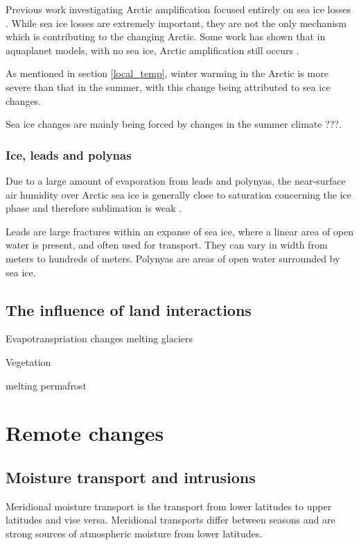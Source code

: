 \documentclass[11pt, oneside]{article}
\begin{document}
Previous work investigating Arctic amplification focused entirely on sea ice losses \cite{serreze2009emergence}. While sea ice losses are extremely important, they are not the only mechanism which is contributing to the changing Arctic.  Some work has shown that in aquaplanet models, with no sea ice, Arctic amplification still occurs \cite{russotto2020polar}.

As mentioned in section \ref{local_temp}, winter warming in the Arctic is more severe than that in the summer, with this change being attributed to sea ice changes.

Sea ice changes are mainly being forced by changes in the summer climate ???.

\subsubsection{Ice, leads and polynas}
 Due to a large amount of evaporation from leads and polynyas, the near-surface air humidity over Arctic sea ice is generally close to saturation concerning the ice phase and therefore sublimation is weak \cite{andreas2002near}. 
 
 Leads are large fractures within an expanse of sea ice, where a linear area of open water is present, and often used for transport. They can vary in width from meters to hundreds of meters. Polynyas are areas of open water surrounded by sea ice.



\subsection{The influence of land interactions}
Evapotranspriation changes 
melting glaciers 

Vegetation

melting permafrost 


\section{Remote changes}\label{remote}
\subsection{Moisture transport and intrusions}
Meridional moisture transport is the transport from lower latitudes to upper latitudes and vise versa. Meridional transports differ between seasons and are strong sources of atmospheric moisture from lower latitudes. 
\end{document}
